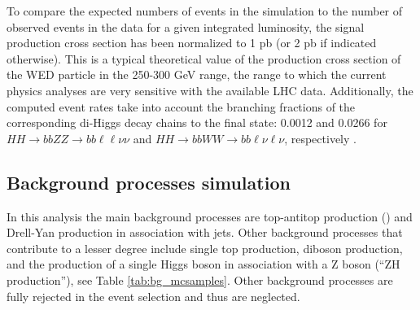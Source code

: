 To compare the expected numbers of events in the simulation to the number of observed events in the data for a given integrated luminosity, the signal production cross section has been normalized to 1 pb (or 2 pb if indicated otherwise). This is a typical theoretical value of the production cross section of the WED particle in the 250-300 GeV range, the range to which the current physics analyses are very sensitive with the available LHC data. Additionally, the computed event rates take into account the branching fractions of the corresponding di-Higgs decay chains to the final state: 0.0012 and 0.0266 for $HH\to bbZZ\to bb\ell\ell\nu\nu$ and $HH\to bbWW\to bb\ell\nu\ell\nu$, respectively \cite{CERNYR4}.

\subsection{Background processes simulation\label{sec:bkgMC}}
In this analysis the main background processes are top-antitop production (\ttbar) and Drell-Yan production in association with jets. 
Other background processes that contribute to a lesser degree include single top production, diboson production, and the production of a single Higgs boson in association with a Z boson (``ZH production''), see Table \ref{tab:bg_mcsamples}. Other background processes are fully rejected in the event selection and thus are neglected. 

